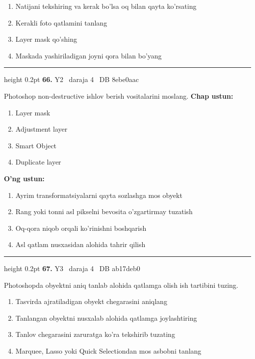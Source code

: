 \documentclass[10pt,a4paper,oneside]{article}
\begin{document}
\begin{enumerate}[label=\Alph*),leftmargin=9mm]
\item Natijani tekshiring va kerak bo'lsa oq bilan qayta ko'rsating
\item Kerakli foto qatlamini tanlang
\item Layer mask qo'shing
\item Maskada yashiriladigan joyni qora bilan bo'yang
\end{enumerate}
\vspace{2mm}\hrule height 0.2pt \vspace{4mm}
\hypertarget{q66}{\textbf{\color{ink}66.}}  {\color{muted}\scriptsize Y2 \textbullet\ daraja 4 \textbullet\ DB 8ebe0aac}
\par
Photoshop non-destructive ishlov berish vositalarini moslang.
\textbf{\footnotesize Chap ustun:}
\begin{enumerate}[label=\arabic*),leftmargin=9mm]
\item Layer mask
\item Adjustment layer
\item Smart Object
\item Duplicate layer
\end{enumerate}
\textbf{\footnotesize O'ng ustun:}
\begin{enumerate}[label=\Alph*),leftmargin=9mm]
\item Ayrim transformatsiyalarni qayta sozlashga mos obyekt
\item Rang yoki tonni asl pikselni bevosita o'zgartirmay tuzatish
\item Oq-qora niqob orqali ko'rinishni boshqarish
\item Asl qatlam nusxasidan alohida tahrir qilish
\end{enumerate}
\vspace{2mm}\hrule height 0.2pt \vspace{4mm}
\hypertarget{q67}{\textbf{\color{ink}67.}}  {\color{muted}\scriptsize Y3 \textbullet\ daraja 4 \textbullet\ DB ab17deb0}
\par
Photoshopda obyektni aniq tanlab alohida qatlamga olish ish tartibini tuzing.
\begin{enumerate}[label=\Alph*),leftmargin=9mm]
\item Tasvirda ajratiladigan obyekt chegarasini aniqlang
\item Tanlangan obyektni nusxalab alohida qatlamga joylashtiring
\item Tanlov chegarasini zaruratga ko'ra tekshirib tuzating
\item Marquee, Lasso yoki Quick Selectiondan mos asbobni tanlang
\end{enumerate}
\end{document}
